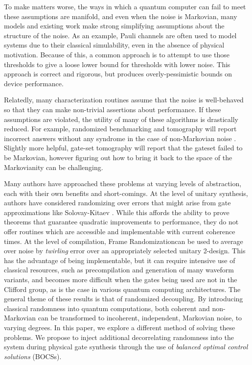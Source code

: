 \documentclass[aps,nofootinbib,pra,notitlepage,twocolumn]{revtex4-1}
\begin{document}
To make matters worse, the ways in which a quantum computer can fail to meet these assumptions are manifold\cite{Kelly2018, BlumeKohout2017, Klimov2018}, and even when the noise is Markovian, many models and existing work make strong simplifying assumptions about the structure of the noise. As an example, Pauli channels are often used to model systems due to their classical simulability\cite{quant-ph/9807006}, even in the absence of physical motivation\cite{Aliferis2007, Knill2005, Wang2011, DuclosCianci2010, Wootton2012, Bombin2012, Puzzuoli2014, aliferis2008accuracy}. Because of this, a common approach is to attempt to use those thresholds to give a loose lower bound for thresholds with lower noise\cite{Puzzuoli2014}. This approach is correct and rigorous, but produces overly-pessimistic bounds on device performance.

Relatedly, many characterization routines assume that the noise is well-behaved so that they can make non-trivial assertions about performance. If these assumptions are violated, the utility of many of these algorithms is drastically reduced. For example, randomized benchmarking and tomography will report incorrect answers without any syndrome in the case of non-Markovian noise \cite{Merkel2013}. Slightly more helpful, gate-set tomography will report that the gateset failed to be Markovian, however figuring out how to bring it back to the space of the Markovianity can be challenging.

Many authors have approached these problems at varying levels of abstraction, each with their own benefits and short-comings. At the level of unitary synthesis, authors have considered randomizing over errors that might arise from gate approximations like Solovay-Kitaev \cite{Campbell2017, 1612.01011}. While this affords the ability to prove theorems that guarantee quadratic improvements to performance, they do not offer routines which are accessible and implementable with current coherence times. At the level of compilation, Frame Randomization\cite{Wallman2016, Ware2018}can be used to average over noise by \textit{twirling} error over an appropriately selected unitary 2-design.\cite{roy2009unitary} This has the advantage of being implementable\cite{Ware2018}, but it can require intensive use of classical resources, such as precompilation and generation of many waveform variants, and becomes more difficult when the gates being used are not in the Clifford group, as is the case in various quantum computing architectures. The general theme of these results is that of randomized decoupling\cite{Viola2005, Viola}. By introducing classical randomness into quantum computations, both coherent and non-Markovian can be transformed to incoherent, independent, Markovian noise, to varying degrees. In this paper, we explore a different method of solving these problems. We propose to inject additional decorrelating randomness into the system during physical gate synthesis through the use of \emph{balanced optimal control solutions} (BOCSs).
\end{document}
